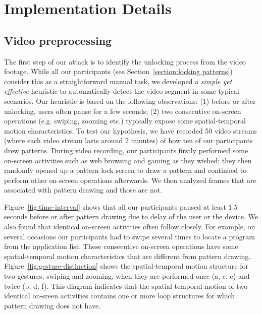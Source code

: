 \section{Implementation Details}

\subsection{Video preprocessing \label{sec:identify}}
\label{section:recognition}
The first step of our attack is to identify the unlocking process from the
video footage. While all our
participants (see Section~\ref{section:locking patterns}) consider this as a straightforward manual task, we developed a \emph{simple yet effective} heuristic to automatically detect the video segment in some typical scenarios. Our heuristic is based on the following observations: (1) before or after
unlocking, users often pause for a few seconds; (2) two consecutive on-screen operations (e.g. swiping, zooming etc.) typically expose some spatial-temporal motion characteristics.
To test our hypothesis, we have recorded 50 video streams (where each
video stream lasts around 2 minutes) of how ten of our participants drew
patterns. During video recording, our participants firstly performed
some on-screen activities such as web browsing and gaming as they wished;
they then randomly opened up a pattern lock screen to draw a pattern and
continued to perform other on-screen operations afterwards.
We then analyzed frames that are associated with pattern drawing and those are not.


Figure~\ref{fig:time-interval} shows that all our participants paused at least $1.5$ seconds before or after pattern drawing due to delay of the user or the device.
We also found that identical on-screen activities often follow closely. For example, on several occasions our participants had to swipe several times  to locate a program from the application list.
These consecutive on-screen operations have some spatial-temporal motion characteristics that are different from pattern drawing.
Figure~\ref{fig:gesture-distinction} shows the spatial-temporal motion structure for  two gestures, swiping and zooming, when they are performed once (a, c, e) and twice (b, d, f).
This diagram indicates that the spatial-temporal motion of two identical on-sreen activities contains one or more loop structures for which pattern drawing does not have.


